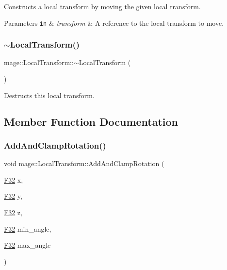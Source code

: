 Constructs a local transform by moving the given local transform.


\begin{DoxyParams}[1]{Parameters}
\mbox{\tt in}  & {\em transform} & A reference to the local transform to move. \\
\hline
\end{DoxyParams}
\hypertarget{classmage_1_1_local_transform_ada7472793bea34f1fbbea0856b124411}{}\label{classmage_1_1_local_transform_ada7472793bea34f1fbbea0856b124411} 
\subsubsection{\texorpdfstring{$\sim$\+Local\+Transform()}{~LocalTransform()}}
{\footnotesize\ttfamily mage\+::\+Local\+Transform\+::$\sim$\+Local\+Transform (\begin{DoxyParamCaption}{ }\end{DoxyParamCaption})\hspace{0.3cm}{\ttfamily [default]}}

Destructs this local transform. 

\subsection{Member Function Documentation}
\hypertarget{classmage_1_1_local_transform_aa5c60513e379baae81f79cea835d1896}{}\label{classmage_1_1_local_transform_aa5c60513e379baae81f79cea835d1896} 
\subsubsection{\texorpdfstring{Add\+And\+Clamp\+Rotation()}{AddAndClampRotation()}\hspace{0.1cm}{\footnotesize\ttfamily [1/3]}}
{\footnotesize\ttfamily void mage\+::\+Local\+Transform\+::\+Add\+And\+Clamp\+Rotation (\begin{DoxyParamCaption}\item[{\hyperlink{namespacemage_aa97e833b45f06d60a0a9c4fc22ae02c0}{F32}}]{x,  }\item[{\hyperlink{namespacemage_aa97e833b45f06d60a0a9c4fc22ae02c0}{F32}}]{y,  }\item[{\hyperlink{namespacemage_aa97e833b45f06d60a0a9c4fc22ae02c0}{F32}}]{z,  }\item[{\hyperlink{namespacemage_aa97e833b45f06d60a0a9c4fc22ae02c0}{F32}}]{min\+\_\+angle,  }\item[{\hyperlink{namespacemage_aa97e833b45f06d60a0a9c4fc22ae02c0}{F32}}]{max\+\_\+angle }\end{DoxyParamCaption})\hspace{0.3cm}{\ttfamily [noexcept]}}

